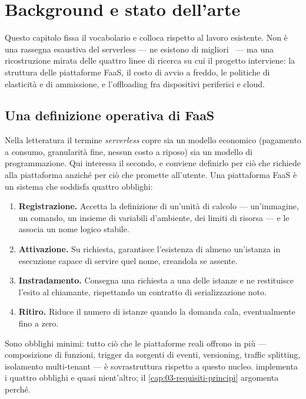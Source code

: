 \chapter{Background e stato dell'arte}
\label{cap:02-stato-dell-arte}

Questo capitolo fissa il vocabolario e colloca \nf{} rispetto al lavoro
esistente. Non \`e una rassegna esaustiva del serverless --- ne esistono di
migliori~\cite{jonas2019berkeley, baldini2017trends} --- ma una ricostruzione
mirata delle quattro linee di ricerca su cui il progetto interviene: la
struttura delle piattaforme FaaS, il costo di avvio a freddo, le politiche di
elasticit\`a e di ammissione, e l'offloading fra dispositivi periferici e
cloud.

\section{Una definizione operativa di FaaS}

Nella letteratura il termine \emph{serverless} copre sia un modello economico
(pagamento a consumo, granularit\`a fine, nessun costo a riposo) sia un modello
di programmazione. Qui interessa il secondo, e conviene definirlo per ci\`o che
richiede alla piattaforma anzich\'e per ci\`o che promette all'utente. Una
piattaforma FaaS \`e un sistema che soddisfa quattro obblighi:

\begin{enumerate}[leftmargin=*]
  \item \textbf{Registrazione.} Accetta la definizione di un'unit\`a di calcolo
  --- un'immagine, un comando, un insieme di variabili d'ambiente, dei limiti di
  risorsa --- e le associa un nome logico stabile.
  \item \textbf{Attivazione.} Su richiesta, garantisce l'esistenza di almeno
  un'istanza in esecuzione capace di servire quel nome, creandola se assente.
  \item \textbf{Instradamento.} Consegna una richiesta a una delle istanze e ne
  restituisce l'esito al chiamante, rispettando un contratto di
  serializzazione noto.
  \item \textbf{Ritiro.} Riduce il numero di istanze quando la domanda cala,
  eventualmente fino a zero.
\end{enumerate}

Sono obblighi minimi: tutto ci\`o che le piattaforme reali offrono in pi\`u ---
composizione di funzioni, trigger da sorgenti di eventi, versioning, traffic
splitting, isolamento multi-tenant --- \`e sovrastruttura rispetto a questo
nucleo. \nf{} implementa i quattro obblighi e quasi nient'altro; il
\cref{cap:03-requisiti-principi} argomenta perch\'e.

